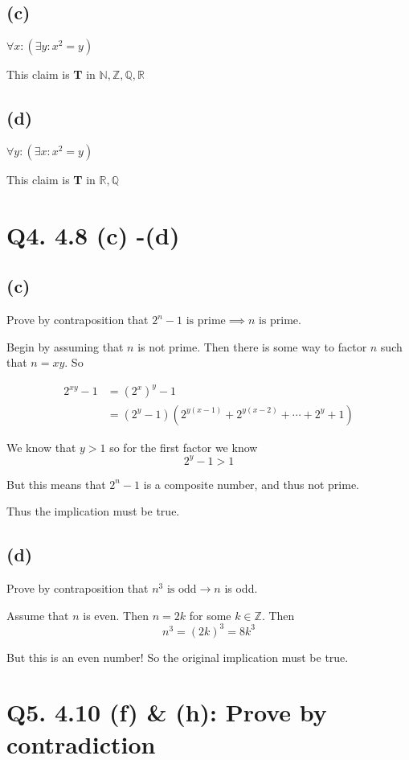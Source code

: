 \documentclass{article}
\begin{document}
\subsection*{(c)} $\forall x : (\exists y : x^2 = y)$

This claim is \textbf{T} in $\mathbb{N}, \mathbb{Z}, \mathbb{Q}, \mathbb{R}$

\subsection*{(d)} $\forall y : (\exists x : x^2 = y)$

This claim is \textbf{T} in $\mathbb{R}, \mathbb{Q}$



\section*{Q4. 4.8 (c) -(d)}

\subsection*{(c)} Prove by contraposition that $2^n - 1 \text{ is prime} \implies n \text{ is prime.}$

Begin by assuming that $n$ is not prime. Then there is some way to factor $n$ such that $n = xy$. So

\begin{align*}
2^{xy} -1 &= (2^x)^y - 1 \\
&= (2^y - 1)(2^{y(x-1)} + 2^{y(x-2)} + \cdots + 2^y + 1)
\end{align*}

We know that $y > 1$ so for the first factor we know $$2^y - 1 > 1$$

But this means that $2^n - 1$ is a composite number, and thus not prime. 

Thus the implication must be true.

\subsection*{(d)} Prove by contraposition that $n^3 \text{ is odd} \rightarrow n$ is odd.

Assume that $n$ is even. Then $n = 2k$ for some $k \in \mathbb{Z}$. Then $$n^3 = (2k)^3 = 8k^3$$

But this is an even number! So the original implication must be true.


\section*{Q5. 4.10 (f) \& (h): Prove by contradiction}
\end{document}

